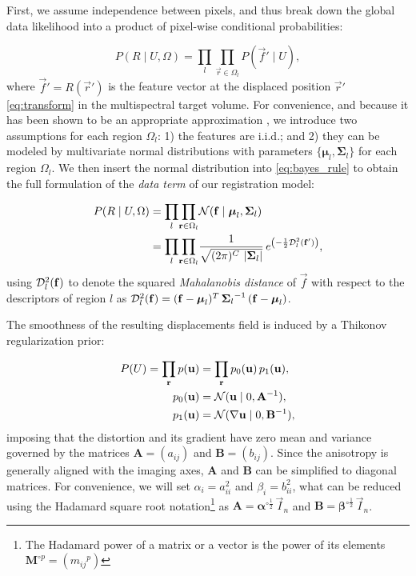 First, we assume independence between pixels, and thus break down the
  global data likelihood into a product of pixel-wise conditional probabilities:

  \begin{equation}
  P(R \mid U,\Omega) = \underset{l}{\prod} \underset{\vec{r}\in \Omega_l}{\prod}
    P\left( \vec{f}' \mid U \right),
  \label{eq:bayes_aposteriori}
  \end{equation}
%
  where $\vec{f}' = R(\vec{r}')$ is the feature vector at the displaced
  position $\vec{r}'$ \eqref{eq:transform} in the multispectral target
  volume.
For convenience, and because it has been shown to be an appropriate approximation
  \citep{leemput_automated_1999,cuadra_comparison_2005}, we introduce two assumptions for each
  region $\Omega_l$:
  1) the features are i.i.d.; and 2) they can be modeled by multivariate normal
  distributions with parameters $\lbrace \boldsymbol{\mu}_l, \boldsymbol{\Sigma}_{l} \rbrace$
  for each region $\Omega_l$.
We then insert the normal distribution into \eqref{eq:bayes_rule} to obtain the full
  formulation of the \emph{data term} of our registration model:

 	\begin{align}
  P( R \mid U, \Omega ) &= \underset{l}{\prod} \underset{\vec{r} \in \Omega_l}{\prod}
  \mathcal{N} ( \vec{f} \mid \boldsymbol{\mu}_l, \boldsymbol{\Sigma}_{l} ) \notag\\
  &= \underset{l}{\prod} \underset{\vec{r} \in \Omega_l}{\prod} \frac{1}{ \sqrt{(2\pi)^{C}\,\left|\boldsymbol{\Sigma}_{l}\right|}}\,{e^{\left(-\frac{1}{2}
  \mdist{f'}{l} \right)}},
  \label{eq:pdf}
  \end{align}
%
  using $\mdist{f}{l}$ to denote the squared \emph{Mahalanobis distance} of $\vec{f}$ with respect
  to the descriptors of region $l$ as
  $\mdist{f}{l} = (\vec{f} - \boldsymbol{\mu}_l)^T \, {\boldsymbol{\Sigma}_l}^{-1} \, (\vec{f} - \boldsymbol{\mu}_l)$.


The smoothness of the resulting displacements field is induced by a Thikonov regularization
  prior:

  \begin{align*}
  P(U) = \underset{\vec{r}}{\prod}\, p(\vec{u}) &=
  \underset{\vec{r}}{\prod}\, p_0(\vec{u}) \, p_1(\vec{u}), \\
  p_0(\vec{u}) &= \mathcal{N}( \vec{u} \mid 0, \mathbf{A}^{-1}), \notag\\
  p_1(\vec{u}) &= \mathcal{N}(  \nabla \vec{u} \mid 0, \mathbf{B}^{-1}),
  \end{align*}
%
  imposing that the distortion and its gradient have zero
  mean and variance governed by the matrices $\mathbf{A} = (a_{ij})$ and $\mathbf{B} = (b_{ij})$.
Since the anisotropy is generally aligned with the imaging axes, $\mathbf{A}$ and $\mathbf{B}$
  can be simplified to diagonal matrices.
For convenience, we will set $\alpha_i = a_{ii}^2$ and $\beta_i = b_{ii}^2$, what can be reduced
  using the Hadamard square root notation\footnote{The Hadamard power of a matrix or a vector
  is the power of its elements $\mathbf{M}^{\circ p} = ({m_{ij}}^{p})$} as
  $\mathbf{A}=\boldsymbol{\alpha}^{\circ\frac12}\,\vec{I}_n$ and
  $\mathbf{B}=\boldsymbol{\beta}^{\circ\frac12}\,\vec{I}_n$.



